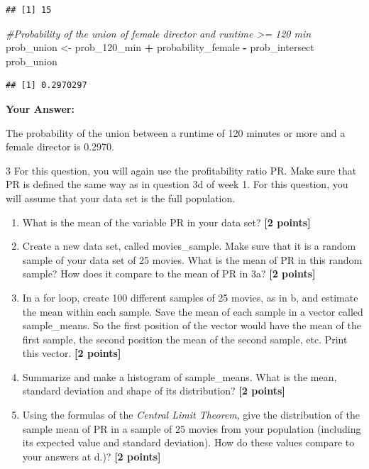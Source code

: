 \documentclass[
]{article}
\newenvironment{Shaded}{\begin{snugshade}}{\end{snugshade}}
\newcommand{\CommentTok}[1]{\textcolor[rgb]{0.56,0.35,0.01}{\textit{#1}}}
\newcommand{\NormalTok}[1]{#1}
\newcommand{\OtherTok}[1]{\textcolor[rgb]{0.56,0.35,0.01}{#1}}
\newcommand{\SpecialCharTok}[1]{\textcolor[rgb]{0.81,0.36,0.00}{\textbf{#1}}}
\providecommand{\tightlist}{%
  \setlength{\itemsep}{0pt}\setlength{\parskip}{0pt}}
\begin{document}
\begin{verbatim}
## [1] 15
\end{verbatim}

\begin{Shaded}
\begin{Highlighting}[]
\CommentTok{\#Probability of the union of female director and runtime \textgreater{}= 120 min}
\NormalTok{prob\_union }\OtherTok{\textless{}{-}}\NormalTok{ prob\_120\_min }\SpecialCharTok{+}\NormalTok{ probability\_female }\SpecialCharTok{{-}}\NormalTok{ prob\_intersect}
\NormalTok{prob\_union}
\end{Highlighting}
\end{Shaded}

\begin{verbatim}
## [1] 0.2970297
\end{verbatim}

\textbf{Your Answer:}

The probability of the union between a runtime of 120 minutes or more
and a female director is 0.2970.

3 For this question, you will again use the profitability ratio PR. Make
sure that PR is defined the same way as in question 3d of week 1. For
this question, you will assume that your data set is the full
population.

\begin{enumerate}
\def\labelenumi{\alph{enumi}.}
\tightlist
\item
  What is the mean of the variable PR in your data set?
  \textbf{[2 points]}
\item
  Create a new data set, called movies\_sample. Make sure that it is a
  random sample of your data set of 25 movies. What is the mean of PR in
  this random sample? How does it compare to the mean of PR in 3a?
  \textbf{[2 points]}
\item
  In a for loop, create 100 different samples of 25 movies, as in b, and
  estimate the mean within each sample. Save the mean of each sample in
  a vector called sample\_means. So the first position of the vector
  would have the mean of the first sample, the second position the mean
  of the second sample, etc. Print this vector. \textbf{[2 points]}
\item
  Summarize and make a histogram of sample\_means. What is the mean,
  standard deviation and shape of its distribution? \textbf{[2 points]}
\item
  Using the formulas of the \emph{Central Limit Theorem}, give the
  distribution of the sample mean of PR in a sample of 25 movies from
  your population (including its expected value and standard deviation).
  How do these values compare to your answers at d.)?
  \textbf{[2 points]}
\end{enumerate}
\end{document}
